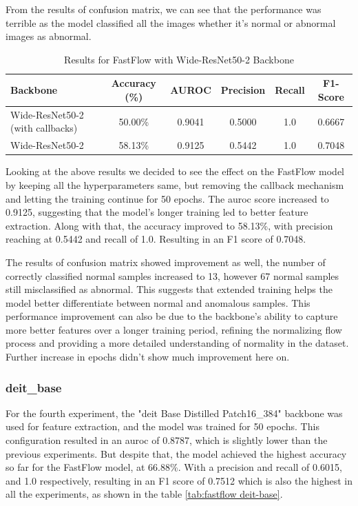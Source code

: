 From the results of confusion matrix, we can see that the performance was terrible as the model classified all the images whether it's normal or abnormal images as abnormal.

\begin{table}[ht!]
    \centering
    \begin{tabular}{|l|c|c|c|c|c|}
        \hline
        \textbf{Backbone} & \textbf{Accuracy (\%)} & \textbf{AUROC} & \textbf{Precision} & \textbf{Recall} & \textbf{F1-Score} \\ \hline
        Wide-ResNet50-2 (with callbacks) & 50.00\% & 0.9041 & 0.5000 & 1.0 & 0.6667 \\ \hline
        Wide-ResNet50-2 & 58.13\% & 0.9125 & 0.5442 & 1.0 & 0.7048 \\ \hline
    \end{tabular}
    \caption{Results for FastFlow with Wide-ResNet50-2 Backbone}
    \label{tab:fastflow wideresnet50}
\end{table}

Looking at the above results we decided to see the effect on the FastFlow model by keeping all the hyperparameters same, but removing the callback mechanism and letting the training continue for 50 epochs. The \gls{auroc} score increased to 0.9125, suggesting that the model's longer training led to better feature extraction. Along with that, the accuracy improved to 58.13\%, with precision reaching at 0.5442 and recall of 1.0. Resulting in an F1 score of 0.7048.

The results of confusion matrix showed improvement as well, the number of correctly classified normal samples increased to 13, however 67 normal samples still misclassified as abnormal. This suggests that extended training helps the model better differentiate between normal and anomalous samples. This performance improvement can also be due to the backbone's ability to capture more better features over a longer training period, refining the normalizing flow process and providing a more detailed understanding of normality in the dataset. Further increase in epochs didn't show much improvement here on.

\subsubsection*{\gls{deit}\_base}

For the fourth experiment, the "\gls{deit} Base Distilled Patch16\_384" backbone was used for feature extraction, and the model was trained for 50 epochs. This configuration resulted in an \gls{auroc} of 0.8787, which is slightly lower than the previous experiments. But despite that, the model achieved the highest accuracy so far for the FastFlow model, at 66.88\%. With a precision and recall of 0.6015, and 1.0 respectively, resulting in an F1 score of 0.7512 which is also the highest in all the experiments, as shown in the table \ref{tab:fastflow deit-base}.

